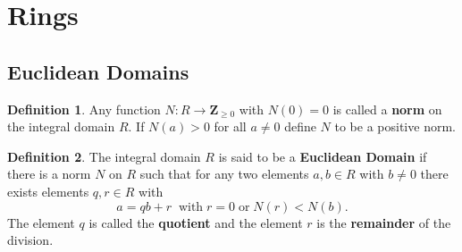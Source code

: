 \documentclass[9pt,reqno]{amsart}
\theoremstyle{definition}
\newtheorem{defi}{Definition}[section]
\newcommand{\zz}{\mathbf Z}
\begin{document}
\section{Rings}
\subsection{Euclidean Domains}


\begin{defi} Any function $N \colon R \to \zz_{\geq 0}$ with $N(0) = 0$ is called a \textbf{norm} on the integral domain $R$. If $N(a) > 0$ for all $a \neq 0$ define $N$ to be a positive norm.
\end{defi}

\begin{defi}
	The integral domain $R$ is said to be a \textbf{Euclidean Domain} if there is a norm $N$ on $R$ such that for any two elements $a, b \in R$ with $b \neq 0 $ there exists elements $q, r \in R$ with $$ a = qb + r \; \; \text{with} \; r =0 \; \text{or} \; N(r) < N(b).$$
	The element $q$ is called the \textbf{quotient} and the element $r$ is the \textbf{remainder} of the division. 
\end{defi}
\end{document}
